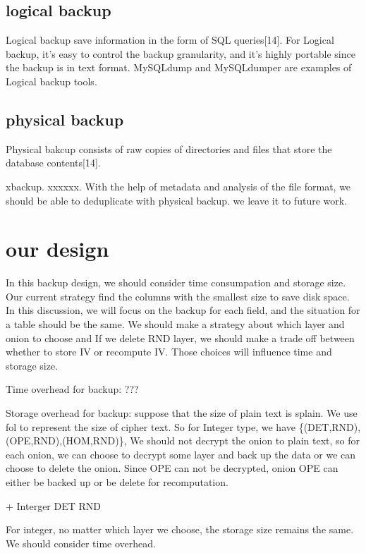 \subsection{logical backup}
Logical backup save information in the form of SQL queries[14]. For Logical backup, it's easy to control the backup granularity, and it's highly portable since the backup is in text format. MySQLdump and MySQLdumper are examples of Logical backup tools. 



\subsection{physical backup}

Physical bakcup consists of raw copies of directories and files that store the database contents[14].

xbackup. xxxxxx. With the help of metadata and analysis of the file format, we should be able to deduplicate with physical backup. we leave it to future work. 



\section{our design}

In this backup design, we should consider time consumpation and storage size. Our current strategy find the columns with the smallest size to save disk space. In this discussion, we will focus on the backup for each field, and the situation for a table should be the same. We should make a strategy about which layer and onion to choose and If we delete RND layer, we should make a trade off between whether to store IV or recompute IV. Those choices will influence time and storage size.


Time overhead for backup:
???


Storage overhead for backup:
suppose that the size of plain text is splain. We use fol to represent the size of cipher text. So for Integer type, we have \{(DET,RND),(OPE,RND),(HOM,RND)\}, We should not decrypt the onion to plain text, so for each onion, we can choose to decrypt some layer and back up the data or we can choose to delete the onion. Since OPE can not be decrypted, onion OPE can either be backed up or be delete for recomputation.  

+ Interger  DET    RND

For integer, no matter which layer we choose, the storage size remains the same. We should consider time overhead.


